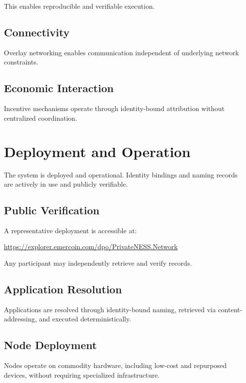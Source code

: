 \documentclass[11pt,a4paper]{article}
\begin{document}
This enables reproducible and verifiable execution.

\subsection{Connectivity}

Overlay networking enables communication independent of underlying network constraints.

\subsection{Economic Interaction}

Incentive mechanisms operate through identity-bound attribution without centralized coordination.

\section{Deployment and Operation}

The system is deployed and operational. Identity bindings and naming records are actively in use and publicly verifiable.

\subsection{Public Verification}

A representative deployment is accessible at:

\begin{center}
\url{https://explorer.emercoin.com/dpo/PrivateNESS.Network}
\end{center}

Any participant may independently retrieve and verify records.

\subsection{Application Resolution}

Applications are resolved through identity-bound naming, retrieved via content-addressing, and executed deterministically.

\subsection{Node Deployment}

Nodes operate on commodity hardware, including low-cost and repurposed devices, without requiring specialized infrastructure.
\end{document}
